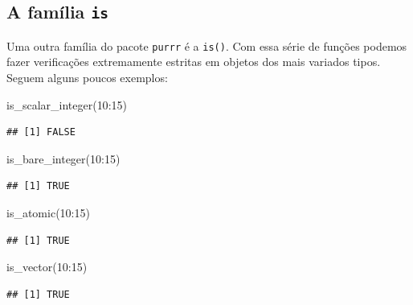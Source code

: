 \documentclass[
]{book}
\newenvironment{Shaded}{\begin{snugshade}}{\end{snugshade}}
\newcommand{\DecValTok}[1]{\textcolor[rgb]{0.00,0.00,0.81}{#1}}
\newcommand{\FunctionTok}[1]{\textcolor[rgb]{0.00,0.00,0.00}{#1}}
\newcommand{\NormalTok}[1]{#1}
\newcommand{\SpecialCharTok}[1]{\textcolor[rgb]{0.00,0.00,0.00}{#1}}
\begin{document}
\hypertarget{a-famuxedlia-is}{%
\subsection{\texorpdfstring{A família \texttt{is}}{A família is}}\label{a-famuxedlia-is}}

Uma outra família do pacote \texttt{purrr} é a \texttt{is()}. Com essa série de funções podemos
fazer verificações extremamente estritas em objetos dos mais variados tipos. Seguem
alguns poucos exemplos:

\begin{Shaded}
\begin{Highlighting}[]
\FunctionTok{is\_scalar\_integer}\NormalTok{(}\DecValTok{10}\SpecialCharTok{:}\DecValTok{15}\NormalTok{)}
\end{Highlighting}
\end{Shaded}

\begin{verbatim}
## [1] FALSE
\end{verbatim}

\begin{Shaded}
\begin{Highlighting}[]
\FunctionTok{is\_bare\_integer}\NormalTok{(}\DecValTok{10}\SpecialCharTok{:}\DecValTok{15}\NormalTok{)}
\end{Highlighting}
\end{Shaded}

\begin{verbatim}
## [1] TRUE
\end{verbatim}

\begin{Shaded}
\begin{Highlighting}[]
\FunctionTok{is\_atomic}\NormalTok{(}\DecValTok{10}\SpecialCharTok{:}\DecValTok{15}\NormalTok{)}
\end{Highlighting}
\end{Shaded}

\begin{verbatim}
## [1] TRUE
\end{verbatim}

\begin{Shaded}
\begin{Highlighting}[]
\FunctionTok{is\_vector}\NormalTok{(}\DecValTok{10}\SpecialCharTok{:}\DecValTok{15}\NormalTok{)}
\end{Highlighting}
\end{Shaded}

\begin{verbatim}
## [1] TRUE
\end{verbatim}
\end{document}
